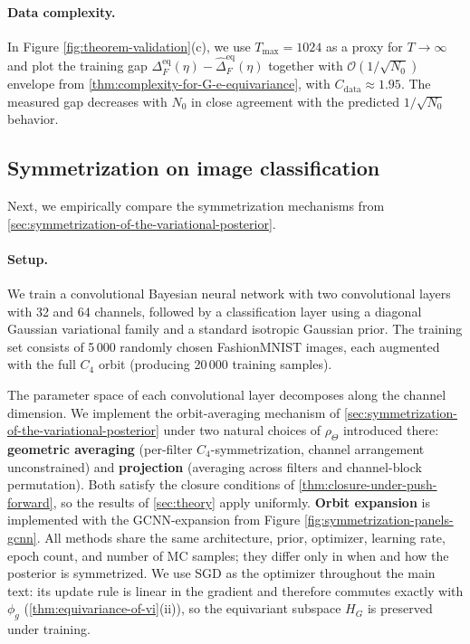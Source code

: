 \documentclass{article}
\begin{document}
\paragraph{Data complexity.} In Figure \ref{fig:theorem-validation}(c), we use $T_{\max} = 1024$ as a proxy for $T \to \infty$ and plot the training gap $\Delta^{\mathrm{eq}}_{F}(\eta) - \widehat{\Delta}^{\mathrm{eq}}_{F}(\eta)$ together with $\mathcal{O}(1 / \sqrt{N_{0}})$ envelope from \cref{thm:complexity-for-G-e-equivariance}, with $C_{\mathrm{data}} \approx 1.95$. The measured gap decreases with $N_0$ in close agreement with the predicted $1/\sqrt{N_0}$ behavior.


\subsection{Symmetrization on image classification}
\label{sec:symmetrization-on-image-classification}


Next, we empirically compare the symmetrization mechanisms from \cref{sec:symmetrization-of-the-variational-posterior}.

\paragraph{Setup.} We train a convolutional Bayesian neural network with two convolutional layers with 32 and 64 channels, followed by a classification layer using a diagonal Gaussian variational family and a standard isotropic Gaussian prior. The training set consists of 5\,000 randomly chosen FashionMNIST images, each augmented with the full $C_{4}$ orbit (producing 20\,000 training samples). 

The parameter space of each convolutional layer decomposes along the channel dimension. We implement the orbit-averaging mechanism of \cref{sec:symmetrization-of-the-variational-posterior} under two natural choices of $\rho_{\Theta}$ introduced there: \textbf{geometric averaging} (per-filter $C_{4}$-symmetrization, channel arrangement unconstrained) and \textbf{projection} (averaging across filters and channel-block permutation). Both satisfy the closure conditions of \cref{thm:closure-under-push-forward}, so the results of \cref{sec:theory} apply uniformly. \textbf{Orbit expansion} is implemented with the GCNN-expansion from Figure \ref{fig:symmetrization-panels-gcnn}.
All methods share the same architecture, prior, optimizer, learning rate, epoch count, and number of MC samples; they differ only in when and how the posterior is symmetrized. We use SGD as the optimizer throughout the main text: its update rule is linear in the gradient and therefore commutes exactly with $\phi_{g}$ (\cref{thm:equivariance-of-vi}(ii)), so the equivariant subspace $H_{G}$ is preserved under training.
\end{document}
